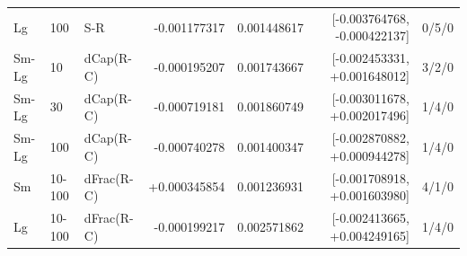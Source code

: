 \begin{longtable}{lllrrrr}
Lg & 100 & S-R & -0.001177317 & 0.001448617 & [-0.003764768, -0.000422137] & 0/5/0 \\
Sm-Lg & 10 & dCap(R-C) & -0.000195207 & 0.001743667 & [-0.002453331, +0.001648012] & 3/2/0 \\
Sm-Lg & 30 & dCap(R-C) & -0.000719181 & 0.001860749 & [-0.003011678, +0.002017496] & 1/4/0 \\
Sm-Lg & 100 & dCap(R-C) & -0.000740278 & 0.001400347 & [-0.002870882, +0.000944278] & 1/4/0 \\
Sm & 10-100 & dFrac(R-C) & +0.000345854 & 0.001236931 & [-0.001708918, +0.001603980] & 4/1/0 \\
Lg & 10-100 & dFrac(R-C) & -0.000199217 & 0.002571862 & [-0.002413665, +0.004249165] & 1/4/0 \\
\end{longtable}
\endgroup

